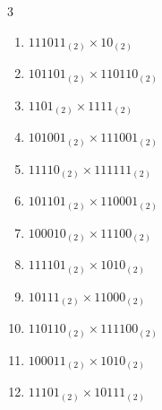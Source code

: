 \begin{multicols}{3}
\begin{enumerate}
\columnbreak %

  \item $111011_{(2)} \times 10_{(2)}$


  \item $101101_{(2)} \times 110110_{(2)}$


  \item $1101_{(2)} \times 1111_{(2)}$


  \item $101001_{(2)} \times 111001_{(2)}$


  \item $11110_{(2)} \times 111111_{(2)}$


\columnbreak %

  \item $101101_{(2)} \times 110001_{(2)}$


  \item $100010_{(2)} \times 11100_{(2)}$


  \item $111101_{(2)} \times 1010_{(2)}$


  \item $10111_{(2)} \times 11000_{(2)}$


  \item $110110_{(2)} \times 111100_{(2)}$


\columnbreak %

\resetques

  \item $100011_{(2)} \times 1010_{(2)}$


  \item $11101_{(2)} \times 10111_{(2)}$



\end{enumerate}
\end{multicols}
